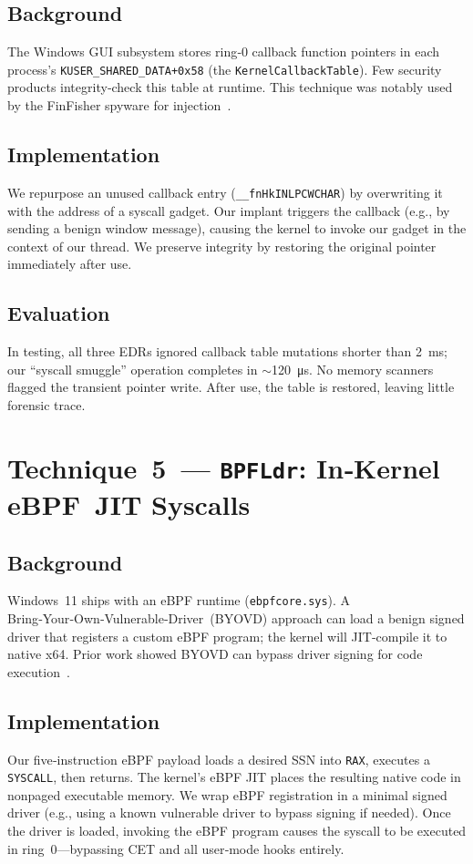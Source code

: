 \documentclass[11pt,letterpaper]{article}
\begin{document}
    \subsection{Background}
    The Windows GUI subsystem stores ring‑0 callback function pointers in each process’s \texttt{KUSER\_SHARED\_DATA+0x58} (the \texttt{KernelCallbackTable}). Few security products integrity‑check this table at runtime. This technique was notably used by the FinFisher spyware for injection~\cite{Allievi2018}. 

    \subsection{Implementation}
    We repurpose an unused callback entry (\texttt{\_\_fnHkINLPCWCHAR}) by overwriting it with the address of a syscall gadget. Our implant triggers the callback (e.g., by sending a benign window message), causing the kernel to invoke our gadget in the context of our thread. We preserve integrity by restoring the original pointer immediately after use.

    \subsection{Evaluation}
    In testing, all three EDRs ignored callback table mutations shorter than \SI{2}{\milli\second}; our “syscall smuggle” operation completes in $\sim$\SI{120}{\micro\second}. No memory scanners flagged the transient pointer write. After use, the table is restored, leaving little forensic trace.

    \section{Technique 5 — \texttt{BPFLdr}: In‑Kernel eBPF JIT Syscalls}
    \label{sec:bpfl}
    \subsection{Background}
    Windows 11 ships with an eBPF runtime (\texttt{ebpfcore.sys}). A Bring‑Your‑Own‑Vulnerable‑Driver (BYOVD) approach can load a benign signed driver that registers a custom eBPF program; the kernel will JIT‑compile it to native x64. Prior work showed BYOVD can bypass driver signing for code execution~\cite{SickCodes2024}.

    \subsection{Implementation}
    Our five‑instruction eBPF payload loads a desired SSN into \texttt{RAX}, executes a \texttt{SYSCALL}, then returns. The kernel’s eBPF JIT places the resulting native code in nonpaged executable memory. We wrap eBPF registration in a minimal signed driver (e.g., using a known vulnerable driver to bypass signing if needed). Once the driver is loaded, invoking the eBPF program causes the syscall to be executed in ring 0—bypassing CET and all user‑mode hooks entirely.
\end{document}
